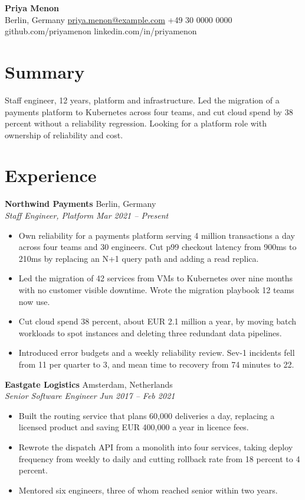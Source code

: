 \documentclass[10.5pt,a4paper]{article}
\newcommand{\role}[4]{%
  \textbf{#1} \hfill #2\\%
  \textit{#3} \hfill \textit{#4}\par\vspace{0.15em}%
}
\newenvironment{bullets}{%
  \begin{itemize}[leftmargin=1.05em,itemsep=0.14em,topsep=0.14em,parsep=0pt,label=\textbullet]%
}{\end{itemize}}
\begin{document}
\begin{center}
  {\LARGE\bfseries Priya Menon}\\[0.2em]
  \small
  Berlin, Germany \textbar{}
  \href{mailto:priya.menon@example.com}{priya.menon@example.com} \textbar{}
  +49 30 0000 0000 \textbar{}
  github.com/priyamenon \textbar{}
  linkedin.com/in/priyamenon
\end{center}

\section{Summary}
Staff engineer, 12 years, platform and infrastructure. Led the migration of a
payments platform to Kubernetes across four teams, and cut cloud spend by 38
percent without a reliability regression. Looking for a platform role with
ownership of reliability and cost.

\section{Experience}

\role{Northwind Payments}{Berlin, Germany}{Staff Engineer, Platform}{Mar 2021 -- Present}
\begin{bullets}
  \item Own reliability for a payments platform serving 4 million transactions a day across four teams and 30 engineers. Cut p99 checkout latency from 900ms to 210ms by replacing an N+1 query path and adding a read replica.
  \item Led the migration of 42 services from VMs to Kubernetes over nine months with no customer visible downtime. Wrote the migration playbook 12 teams now use.
  \item Cut cloud spend 38 percent, about EUR 2.1 million a year, by moving batch workloads to spot instances and deleting three redundant data pipelines.
  \item Introduced error budgets and a weekly reliability review. Sev-1 incidents fell from 11 per quarter to 3, and mean time to recovery from 74 minutes to 22.
\end{bullets}

\role{Eastgate Logistics}{Amsterdam, Netherlands}{Senior Software Engineer}{Jun 2017 -- Feb 2021}
\begin{bullets}
  \item Built the routing service that plans 60,000 deliveries a day, replacing a licensed product and saving EUR 400,000 a year in licence fees.
  \item Rewrote the dispatch API from a monolith into four services, taking deploy frequency from weekly to daily and cutting rollback rate from 18 percent to 4 percent.
  \item Mentored six engineers, three of whom reached senior within two years.
\end{bullets}
\end{document}
